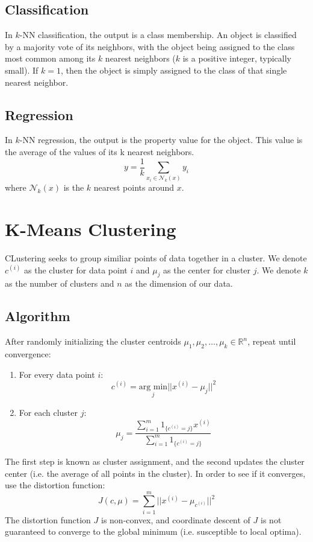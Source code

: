 \documentclass[twoside,twocolumn]{article}
\begin{document}
\subsection{Classification}
In $k$-NN classification, the output is a class membership. An object is
classified by a majority vote of its neighbors, with the object being assigned
to the class most common among its $k$ nearest neighbors ($k$ is a positive integer,
typically small). If $k = 1$, then the object is simply assigned to the class
of that single nearest neighbor.
\subsection{Regression}
In $k$-NN regression, the output is the property value for the object.
This value is the average of the values of its k nearest neighbors.
\begin{equation} y = \frac{1}{k} \sum_{x_i \in \mathcal{N}_k(x)} y_i \end{equation}
where $\mathcal{N}_k(x)$ is the $k$ nearest points around $x$.
\section{K-Means Clustering}
CLustering seeks to group similiar points of data together in a cluster. We
denote $c^{(i)}$ as the cluster for data point $i$ and $\mu_j$ as the center
for cluster $j$. We denote $k$ as the number of clusters and $n$ as the
dimension of our data.
\subsection{Algorithm}
After randomly initializing the cluster centroids
$\mu_1, \mu_2, \hdots, \mu_k \in \mathbb{R}^n$, repeat until convergence:
\begin{enumerate}
  \item For every data point $i$:
    \begin{equation}
      c^{(i)}=\underset{j}{\textrm{arg min}}||x^{(i)}-\mu_j||^2
    \end{equation}
  \item For each cluster $j$:
    \begin{equation}
      \mu_j=\frac{\displaystyle\sum_{i=1}^m1_{\{c^{(i)}=j\}}x^{(i)}}{\displaystyle\sum_{i=1}^m1_{\{c^{(i)}=j\}}}
    \end{equation}
\end{enumerate}
The first step is known as cluster assignment, and the second updates the
cluster center (i.e. the average of all points in the cluster). In order to
see if it converges, use the distortion function:
\begin{equation}
  J(c,\mu)=\sum_{i=1}^m||x^{(i)}-\mu_{c^{(i)}}||^2
\end{equation}
The distortion function $J$ is non-convex, and coordinate descent of $J$ is not
guaranteed to converge to the global minimum (i.e. susceptible to local optima).
\end{document}
